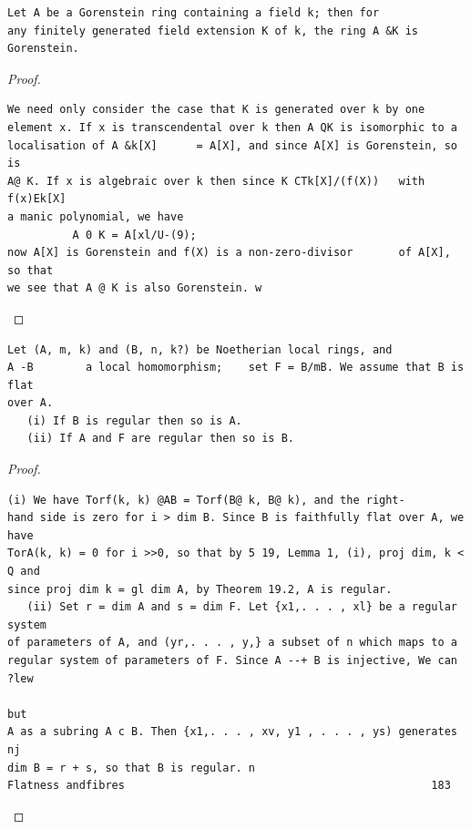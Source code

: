 \begin{theorem}\label{mcrt-auto-theorem-23-6}\uses{}
\begin{verbatim}
Let A be a Gorenstein ring containing a field k; then for
any finitely generated field extension K of k, the ring A &K is Gorenstein.
\end{verbatim}
\end{theorem}
\begin{proof}
\begin{verbatim}
We need only consider the case that K is generated over k by one
element x. If x is transcendental over k then A QK is isomorphic to a
localisation of A &k[X]      = A[X], and since A[X] is Gorenstein, so is
A@ K. If x is algebraic over k then since K CTk[X]/(f(X))   with f(x)Ek[X]
a manic polynomial, we have
          A 0 K = A[xl/U-(9);
now A[X] is Gorenstein and f(X) is a non-zero-divisor       of A[X], so that
we see that A @ K is also Gorenstein. w
\end{verbatim}
\end{proof}


\begin{theorem}\label{mcrt-auto-theorem-23-7}\uses{}
\begin{verbatim}
Let (A, m, k) and (B, n, k?) be Noetherian local rings, and
A -B        a local homomorphism;    set F = B/mB. We assume that B is flat
over A.
   (i) If B is regular then so is A.
   (ii) If A and F are regular then so is B.
\end{verbatim}
\end{theorem}
\begin{proof}
\begin{verbatim}
(i) We have Torf(k, k) @AB = Torf(B@ k, B@ k), and the right-
hand side is zero for i > dim B. Since B is faithfully flat over A, we have
TorA(k, k) = 0 for i >>0, so that by 5 19, Lemma 1, (i), proj dim, k < Q and
since proj dim k = gl dim A, by Theorem 19.2, A is regular.
   (ii) Set r = dim A and s = dim F. Let {x1,. . . , xl} be a regular system
of parameters of A, and (yr,. . . , y,} a subset of n which maps to a
regular system of parameters of F. Since A --+ B is injective, We can ?lew
                                                                          but
A as a subring A c B. Then {x1,. . . , xv, y1 , . . . , ys) generates nj
dim B = r + s, so that B is regular. n
Flatness andfibres                                               183
\end{verbatim}
\end{proof}


